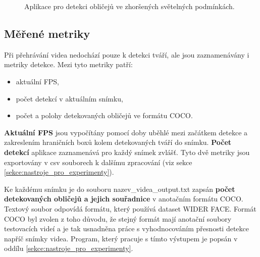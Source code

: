 \begin{figure}[H]
  \begin{center}
  \label{obrazek:gui}
  \caption{Aplikace pro detekci obličejů ve zhoršených světelných podmínkách.}
  \end{center}
\end{figure}

\subsection*{Měřené metriky}
Při přehrávání videa nedochází pouze k detekci tváří, ale jsou zaznamenávány i metriky detekce. Mezi tyto metriky patří:

\begin{itemize}
  \item aktuální FPS,
  \item počet detekcí v aktuálním snímku,
  \item počet a polohy detekovaných obličejů ve formátu COCO.
\end{itemize}

\textbf{Aktuální FPS} jsou vypočítány pomocí doby uběhlé mezi začátkem detekce a zakreslením hraničních boxů kolem detekovaných tváří do snímku. 
\textbf{Počet detekcí} aplikace zaznamenává pro každý snímek zvlášť. Tyto dvě metriky jsou exportovány v csv souborech k dalšímu zpracování (viz sekce \ref{sekce:nastroje_pro_experimenty}).

Ke každému snímku je do souboru nazev\_videa\_output.txt zapsán \textbf{počet detekovaných obličejů a jejich souřadnice} v anotačním formátu COCO. Textový soubor odpovídá formátu, který používá dataset WIDER FACE. Formát COCO byl zvolen z toho důvodu, že stejný formát mají anotační soubory testovacích videí a je tak usnadněna práce s vyhodnocováním přesnosti detekce napříč snímky videa. Program, který pracuje s tímto výstupem je popsán v oddílu \ref{sekce:nastroje_pro_experimenty}.


